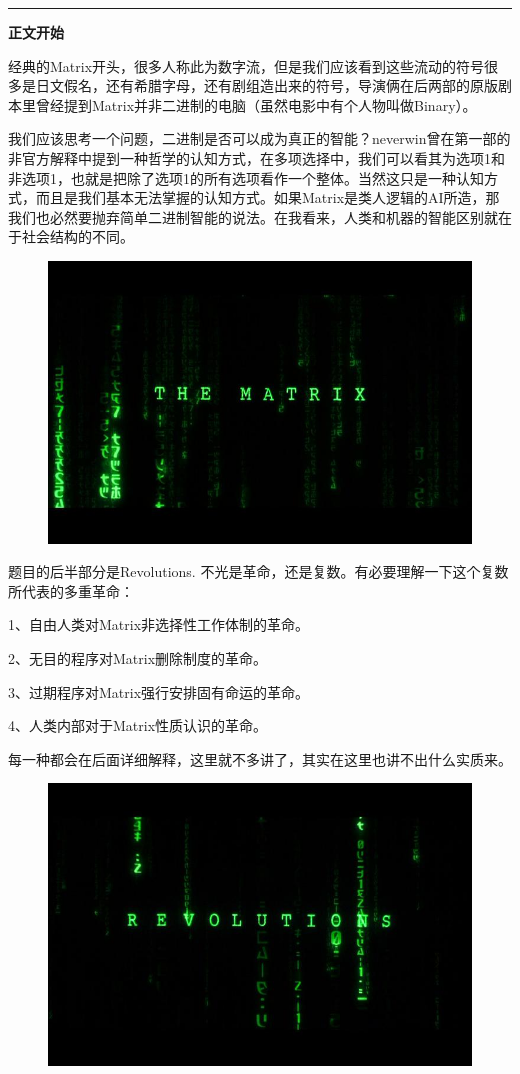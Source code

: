 \documentclass[UTF8]{ctexart}
\newcommand{\myparsep}{\noindent \rule[0.5ex]{\linewidth}{1pt}}
\newcommand{\mysection}[1]{\vspace{1ex} {\centering \bf #1 \par} \vspace{1ex}}
\begin{document}
\myparsep

\vspace*{\fill}
\mysection{正文开始}
\vspace*{\fill}

\newpage

经典的Matrix开头，很多人称此为数字流，但是我们应该看到这些流动的符号很多是日文假名，还有希腊字母，还有剧组造出来的符号，导演俩在后两部的原版剧本里曾经提到Matrix并非二进制的电脑（虽然电影中有个人物叫做Binary）。

我们应该思考一个问题，二进制是否可以成为真正的智能？neverwin曾在第一部的非官方解释中提到一种哲学的认知方式，在多项选择中，我们可以看其为选项1和非选项1，也就是把除了选项1的所有选项看作一个整体。当然这只是一种认知方式，而且是我们基本无法掌握的认知方式。如果Matrix是类人逻辑的AI所造，那我们也必然要抛弃简单二进制智能的说法。在我看来，人类和机器的智能区别就在于社会结构的不同。

\begin{figure}[htb]
\centering
\includegraphics[width=0.5\linewidth]{fig/eeeb9f515ea2062442a75b17.jpg}
\end{figure}

题目的后半部分是Revolutions. 不光是革命，还是复数。有必要理解一下这个复数所代表的多重革命：

1、自由人类对Matrix非选择性工作体制的革命。

2、无目的程序对Matrix删除制度的革命。

3、过期程序对Matrix强行安排固有命运的革命。

4、人类内部对于Matrix性质认识的革命。

每一种都会在后面详细解释，这里就不多讲了，其实在这里也讲不出什么实质来。

\begin{figure}[htb]
\centering
\includegraphics[width=0.5\linewidth]{fig/0b330eb35d354ba7d9335a17.jpg}
\end{figure}
\end{document}
